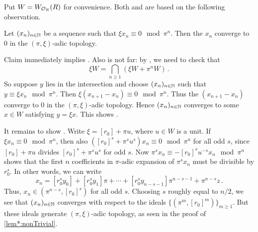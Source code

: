 \documentclass[a4paper, 10pt, oneside, DIV=9, chapterprefix=true, numbers=enddot,bibliography=totoc]{scrbook}
\begin{document}
\begin{proof*}
	Put $W=W_{\mathcal{O}_E}(R)$ for convenience. Both  and  are based on the following observation.
	\begin{alphanumerate}
		\item[\itememph{*}] Let $(x_n)_{n\in \mathbb{N}}$ be a sequence such that $\xi x_n\equiv 0\mod \pi^n$. Then the $x_n$ converge to $0$ in the $(\pi,\xi)$-adic topology.
	\end{alphanumerate}
	Claim \itememph{*} immediately implies . Also   is not far: by \cite[]{stacks-project}, we need to check that
	\begin{equation*}
		\xi W=\bigcap_{n\geq 1}(\xi W+\pi^nW)\,.
	\end{equation*}
	So suppose $y$ lies in the intersection and choose $(x_n)_{n\in \mathbb{N}}$ such that $y\equiv \xi x_n\mod \pi^n$. Then $\xi(x_{n+1}-x_n)\equiv 0\mod \pi^n$. Thus the $(x_{n+1}-x_n)$ converge to $0$ in the $(\pi,\xi)$-adic topology. Hence $(x_n)_{n\in \mathbb{N}}$ converges to some $x\in W$ satisfying $y=\xi x$. This shows .
	
	It remains to show \itememph{*}. Write $\xi=[r_0]+\pi u$, where $u\in W$ is a unit. If $\xi x_n\equiv 0\mod \pi^n$, then also $([r_0]^s+\pi^su^s)x_n\equiv 0\mod \pi^n$ for all odd $s$, since $[r_0]+\pi u$ divides $[r_0]^s+\pi^su^s$ for odd $s$. Now $\pi^sx_n\equiv -[r_0]^su^{-s}x_n\mod \pi^n$ shows that the first $n$ coefficients in $\pi$-adic expansion of $\pi^sx_n$ must be divisible by $r_0^s$. In other words, we can write
	\begin{equation*}
		x_n=[r_0^sy_0]+[r_0^sy_1]\pi+\dotsb+[r_0^sy_{n-s-1}]\pi^{n-s-1}+\pi^{n-s}z\,.
	\end{equation*}
	Thus, $x_n\in(\pi^{n-s},[r_0]^s)$ for all odd $s$. Choosing $s$ roughly equal to $n/2$, we see that $(x_n)_{n\in \mathbb{N}}$ converges with respect to the ideals $\{(\pi^m,[r_0]^m)\}_{m\geq 1}$. But these ideals generate $(\pi,\xi)$-adic topology, as seen in the proof of \cref{lem*:nonTrivial}. 
\end{proof*}
\end{document}
